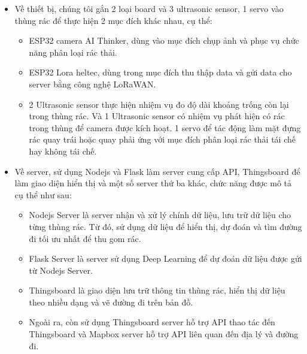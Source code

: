 \begin{itemize}
    \item Về thiết bị, chúng tôi gắn 2 loại board và 3 ultrasonic sensor, 1 servo vào thùng rác để thực hiện 2 mục đích khác nhau, cụ thể:
        \begin{itemize}
            \item ESP32 camera AI Thinker, dùng vào mục đích chụp ảnh và phục vụ chức năng phân loại rác thải.
            \item  ESP32 Lora heltec, dùng trong mục đích thu thập data và gửi data cho server bằng công nghệ LoRaWAN.
            \item 2 Ultrasonic sensor thực hiện nhiệm vụ đo độ dài khoảng trống còn lại trong thùng rác. Và 1 Ultrasonic sensor có nhiệm vụ phát hiện có rác trong thùng để camera được kích hoạt. 1 servo để tác động làm mặt đựng rác quay trái hoặc quay phải ứng với mục đích phân loại rác thải tái chế hay không tái chế.
        \end{itemize}

    \item Về server, sử dụng Nodejs và Flask làm server cung cấp API, Thingsboard để làm giao diện hiển thị và một số server thứ ba khác, chức năng được mô tả cụ thể như sau:
        \begin{itemize}
            \item Nodejs Server là server nhận và xử lý chính dữ liệu, lưu trữ dữ liệu cho từng thùng rác. Từ đó, sử dụng dữ liệu để hiển thị, dự đoán và tìm đường đi tối ưu nhất để thu gom rác.
            \item Flask Server là server sử dụng Deep Learning để dự đoán dữ liệu được gửi từ Nodejs Server.
            \item Thingsboard là giao diện lưu trữ thông tin thùng rác, hiển thị dữ liệu theo nhiều dạng và vẽ đường đi trên bản đồ.
            \item Ngoài ra, còn sử dụng Thingsboard server hỗ trợ API thao tác đến Thingsboard và Mapbox server hỗ trợ API liên quan đến địa lý và đường đi.
        \end{itemize}
   

\end{itemize}


